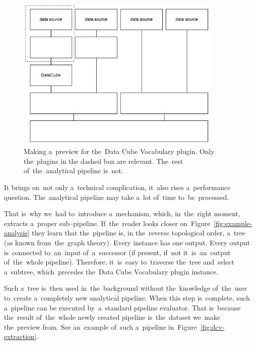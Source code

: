 \begin{figure}
	\centering
	\includegraphics[width=100mm]{img/dcv-preview-useful.png}
	\caption{Making a~preview for the~Data Cube Vocabulary plugin. Only the~plugins in
	the dashed box are relevant. The~rest of~the~analytical pipeline is~not.}
	\label{fig:dcv-preview-useful}
\end{figure}

It brings on~not only a~technical complication, it~also rises a~performance 
question. The~analytical pipeline may take a~lot of~time to~be~processed.

That is~why we~had to~introduce a~mechanism, which, in~the~right moment, 
extracts a~proper sub--pipeline. If~the~reader looks closer on~Figure~\ref{fig:example-analysis} they learn that the~pipeline is,
in the~reverse topological order, 
a~tree (as known from~the~graph theory). Every instance has 
one output. Every output is~connected to~an~input of~a~successor (if present, if~not it~is~an~output
of~the~whole pipeline). Therefore, it~is~easy to~traverse the~tree and~select a~subtree, which~precedes the~Data Cube Vocabulary plugin instance.

Such a~tree is~then used in~the~background without the~knowledge of~the~user to~create a~completely new analytical pipeline. When this step is~complete, such a~pipeline can 
be executed by~a~standard pipeline evaluator. That is~because the~result of~the~whole 
newly created pipeline is~the~dataset we~make the~preview from.
See an~example of~such a~pipeline in~Figure~\ref{fig:dcv-extraction}.

